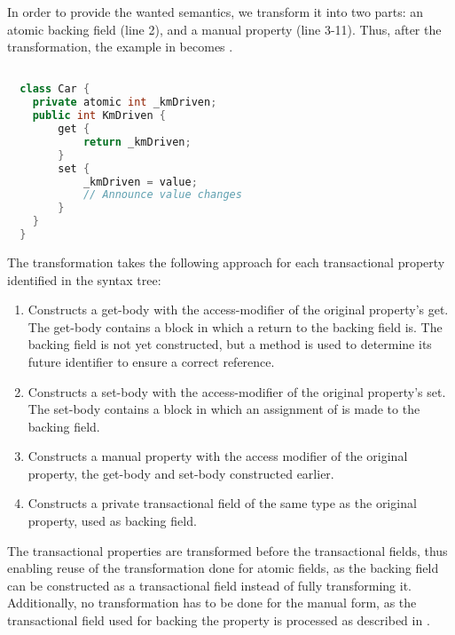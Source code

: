 In order to provide the wanted semantics, we transform it into two parts: an atomic backing field (line 2), and a manual property (line 3-11). Thus, after the transformation, the example in  becomes . 

\begin{lstlisting}[label=lst:after_atomic_property,
  caption={After Transformation},
  language=Java,  
  showspaces=false,
  showtabs=false,
  breaklines=true,
  showstringspaces=false,
  breakatwhitespace=true,
  commentstyle=\color{greencomments},
  keywordstyle=\color{bluekeywords},
  stringstyle=\color{redstrings},
  morekeywords={atomic, retry, orElse, var, get, set}]  % Start your code-block

  class Car {
    private atomic int _kmDriven;
    public int KmDriven {
        get {
            return _kmDriven;
        }
        set {
            _kmDriven = value;
            // Announce value changes
        }
    }
  }
\end{lstlisting}

The transformation takes the following approach for each transactional property identified in the syntax tree:

\begin{enumerate}
	\item Constructs a get-body with the access-modifier of the original property's get. The get-body contains a block in which a return to the backing field is. The backing field is not yet constructed, but a method is used to determine its future identifier to ensure a correct reference.
	\item Constructs a set-body with the access-modifier of the original property's set. The set-body contains a block in which an assignment of  is made to the backing field.
	\item Constructs a manual property with the access modifier of the original property, the get-body and set-body constructed earlier.
	\item Constructs a private transactional field of the same type as the original property, used as backing field.
\end{enumerate}

The transactional properties are transformed before the transactional fields, thus enabling reuse of the transformation done for atomic fields, as the backing field can be constructed as a transactional field instead of fully transforming it. Additionally, no transformation has to be done for the manual form, as the transactional field used for backing the property is processed as described in . 

